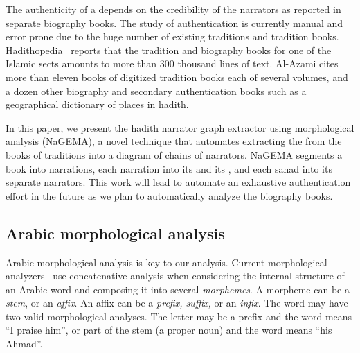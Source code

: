 \documentclass[11pt]{article}
\newcommand{\noArRL}[1]{\arabfalse\RL{#1}\arabtrue}
\begin{document}
The authenticity of a \noArRL{.hady_t} depends on 
the credibility of the narrators as reported in 
separate biography books. 
The study of \noArRL{.hady_t} authentication is 
currently manual and error prone due to the huge number
of existing traditions and tradition books. 
Hadithopedia~\cite{Hadithopaedia:08}
reports that the tradition and biography
books for one of the Islamic sects amounts to more than 
300 thousand lines of text. 
Al-Azami cites more than eleven books
of digitized tradition books each of several volumes, and a dozen
other biography and secondary authentication books such
as a geographical dictionary of places in hadith. 

\novocalize

\transfalse
\begin{figure}[tb]
\end{figure}
\transtrue
\vocalize

In this paper, we present the hadith {narrator graph
extractor using morphological analysis} (NaGEMA), 
a novel technique that automates
extracting the \noArRL{sanad} from the books of traditions 
into a diagram of chains of narrators. NaGEMA segments
a book into narrations, each narration into its \noArRL{matn} 
and its \noArRL{sanad}, 
and each sanad into its separate narrators. 
This work will lead to 
automate an exhaustive \noArRL{.hady_t} authentication 
effort in the future as we plan to 
automatically analyze the biography books.


\subsection{ Arabic morphological analysis}
Arabic morphological analysis is key to our analysis. 
Current morphological analyzers~\cite{Sughaiyer:04}
use concatenative analysis when
considering the internal structure 
of an Arabic word and
composing it into several {\em morphemes}. 
A morpheme can be a {\em stem}, or an {\em affix}.
An affix can be a {\em prefix, suffix, } or an {\em infix}.
\vocalize
The word 
may have two valid morphological analyses. 
The letter  may be a prefix and the word means 
``I praise him'', or 
part of the stem  (a proper noun)
and the word means ``his Ahmad''.
\end{document}
